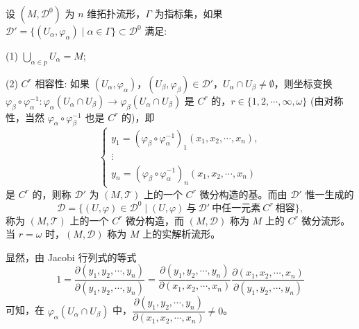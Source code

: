 \begin{definition}\label{def:8.4.2}
设 $(M,\mathcal{D}^{0})$ 为 $n$ 维拓扑流形，$\Gamma$ 为指标集，如果 $\mathcal{D}' = \{(U_{\alpha},\varphi_{\alpha}) \mid \alpha \in \Gamma\} \subset \mathcal{D}^{0}$ 满足:

(1) $\displaystyle\bigcup_{\alpha \in p} U_{\alpha} = M$;

(2) $C^{r}$ 相容性: 如果 $(U_{\alpha},\varphi_{\alpha})$，$(U_{\beta},\varphi_{\beta}) \in \mathcal{D}'$，$U_{\alpha} \cap U_{\beta} \neq \emptyset$，则坐标变换 $\varphi_{\beta} \circ \varphi_{\alpha}^{-1}: \varphi_{\alpha}(U_{\alpha} \cap U_{\beta}) \to \varphi_{\beta}(U_{\alpha} \cap U_{\beta})$ 是 $C^{r}$ 的，$r \in \{1,2,\cdots,\infty,\omega\}$ (由对称性，当然 $\varphi_{\alpha} \circ \varphi_{\beta}^{-1}$ 也是 $C^{r}$ 的)，即
\[
  \left\{\begin{array}{l}
    y_{1} = (\varphi_{\beta} \circ \varphi_{\alpha}^{-1})_{1}(x_{1},x_{2},\cdots,x_{n}), \\
    \vdots \\
    y_{n} = (\varphi_{\beta} \circ \varphi_{\alpha}^{-1})_{n}(x_{1},x_{2},\cdots,x_{n})
  \end{array}\right.
\]
是 $C^{r}$ 的，则称 $\mathcal{D}'$ 为 $(M,\mathcal{T})$ 上的一个 $C^{r}$ 微分构造的基。而由 $\mathcal{D}'$ 惟一生成的
\[
  \mathcal{D} = \bigl\{(U,\varphi) \in \mathcal{D}^{0} \mid (U,\varphi)\ \text{与}\ \mathcal{D}'\ \text{中任一元素}\ C^{r}\ \text{相容}\bigr\},
\]
称为 $(M,\mathcal{T})$ 上的一个 $C^{r}$ 微分构造，而 $(M,\mathcal{D})$ 称为 $M$ 上的 $C^{r}$ 微分流形。当 $r = \omega$ 时，$(M,\mathcal{D})$ 称为 $M$ 上的实解析流形。
\end{definition}

\noindent 显然，由 Jacobi 行列式的等式
\[
  1 = \frac{\partial(y_{1},y_{2},\cdots,y_{n})}{\partial(y_{1},y_{2},\cdots,y_{n})} = \frac{\partial(y_{1},y_{2},\cdots,y_{n})}{\partial(x_{1},x_{2},\cdots,x_{n})}\frac{\partial(x_{1},x_{2},\cdots,x_{n})}{\partial(y_{1},y_{2},\cdots,y_{n})}
\]
可知，在 $\varphi_{\alpha}(U_{\alpha} \cap U_{\beta})$ 中，$\dfrac{\partial(y_{1},y_{2},\cdots,y_{n})}{\partial(x_{1},x_{2},\cdots,x_{n})} \neq 0$。


